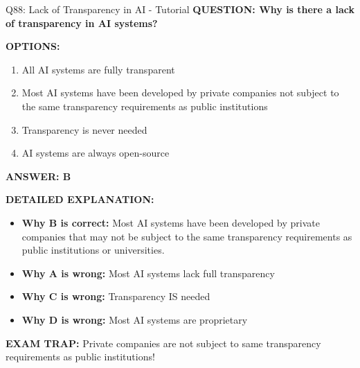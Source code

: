 \documentclass[8pt]{beamer}
\begin{document}
	\begin{frame}{Q88: Lack of Transparency in AI - Tutorial}
		\fontsize{6.5}{7.5}\selectfont
		\textbf{QUESTION: Why is there a lack of transparency in AI systems?}
		
		\vspace{0.1cm}
		\textbf{OPTIONS:}
		\begin{enumerate}
			\item All AI systems are fully transparent
			\item Most AI systems have been developed by private companies not subject to the same transparency requirements as public institutions
			\item Transparency is never needed
			\item AI systems are always open-source
		\end{enumerate}
		
		\vspace{0.1cm}
		\textcolor{myblue}{\textbf{ANSWER: B}}
		
		\vspace{0.1cm}
		\textbf{DETAILED EXPLANATION:}
		\begin{itemize}
			\item \textbf{Why B is correct:} Most AI systems have been developed by private companies that may not be subject to the same transparency requirements as public institutions or universities.
			\item \textbf{Why A is wrong:} Most AI systems lack full transparency
			\item \textbf{Why C is wrong:} Transparency IS needed
			\item \textbf{Why D is wrong:} Most AI systems are proprietary
		\end{itemize}
		
		\textcolor{myred}{\textbf{EXAM TRAP:}} Private companies are \textcolor{myblue}{not subject to same transparency requirements} as public institutions!
	\end{frame}
	
\end{document}
